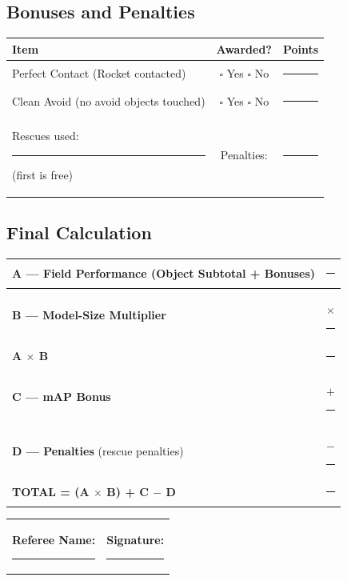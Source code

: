 \documentclass[a4]{article}
\begin{document}
\subsection*{Bonuses and Penalties}

\begin{table}[H]
\centering
\begin{tabular}{|l|c|c|}
\hline
\textbf{Item} & \textbf{Awarded?} & \textbf{Points} \\
\hline
Perfect Contact (Rocket contacted) & $\square$ Yes \quad $\square$ No & \rule{1.5cm}{0.4pt} \\
\hline
Clean Avoid (no avoid objects touched) & $\square$ Yes \quad $\square$ No & \rule{1.5cm}{0.4pt} \\
\hline
Rescues used: \rule{1cm}{0.4pt} (first is free) & Penalties: & \rule{1.5cm}{0.4pt} \\
\hline
\end{tabular}
\end{table}

\subsection*{Final Calculation}

\begin{table}[H]
\centering
\begin{tabular}{|l|r|}
\hline
\textbf{A --- Field Performance} (Object Subtotal + Bonuses) & \rule{3cm}{0.4pt} \\
\hline
\textbf{B --- Model-Size Multiplier} & $\times$ \rule{2cm}{0.4pt} \\
\hline
\textbf{A $\times$ B} & \rule{3cm}{0.4pt} \\
\hline
\textbf{C --- mAP Bonus} & $+$ \rule{2cm}{0.4pt} \\
\hline
\textbf{D --- Penalties} (rescue penalties) & $-$ \rule{2cm}{0.4pt} \\
\hline
\textbf{TOTAL = (A $\times$ B) + C $-$ D} & \rule{3cm}{0.4pt} \\
\hline
\end{tabular}
\end{table}

\vspace{1em}

\begin{tabular}{p{6cm}p{6cm}}
\textbf{Referee Name:} \rule{5cm}{0.4pt} & \textbf{Signature:} \rule{5cm}{0.4pt} \\
\end{tabular}
\end{document}

